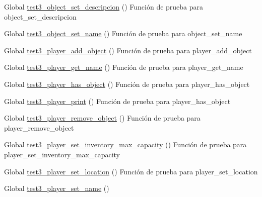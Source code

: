 \begin{DoxyRefList}
\item[Global \mbox{\hyperlink{object__test_8c_a84be9532a8a9cf53a00df0586d065b9f}{test3\+\_\+object\+\_\+set\+\_\+descripcion}} ()]\label{test__test000118}%
%
Función de prueba para object\+\_\+set\+\_\+descripcion  
\item[Global \mbox{\hyperlink{object__test_8c_ab40669b5d083b6484197d917fb6882b1}{test3\+\_\+object\+\_\+set\+\_\+name}} ()]\label{test__test000109}%
%
Función de prueba para object\+\_\+set\+\_\+name  
\item[Global \mbox{\hyperlink{player__test_8c_ac984e5292c95002644a7af4fa499d0fb}{test3\+\_\+player\+\_\+add\+\_\+object}} ()]\label{test__test000140}%
%
Función de prueba para player\+\_\+add\+\_\+object  
\item[Global \mbox{\hyperlink{player__test_8c_a47ca2429d85f332295322002954e1c89}{test3\+\_\+player\+\_\+get\+\_\+name}} ()]\label{test__test000133}%
%
Función de prueba para player\+\_\+get\+\_\+name  
\item[Global \mbox{\hyperlink{player__test_8c_a956409720fca92e245d798491200f3d6}{test3\+\_\+player\+\_\+has\+\_\+object}} ()]\label{test__test000151}%
%
Función de prueba para player\+\_\+has\+\_\+object  
\item[Global \mbox{\hyperlink{player__test_8c_a1d9fc6701483b45427b34a1d8e86e260}{test3\+\_\+player\+\_\+print}} ()]\label{test__test000159}%
%
Función de prueba para player\+\_\+has\+\_\+object  
\item[Global \mbox{\hyperlink{player__test_8c_af84155cb375301e75475a91ef522e191}{test3\+\_\+player\+\_\+remove\+\_\+object}} ()]\label{test__test000143}%
%
Función de prueba para player\+\_\+remove\+\_\+object  
\item[Global \mbox{\hyperlink{player__test_8c_ae3447f70a2f6ccb4f501f7630c667a73}{test3\+\_\+player\+\_\+set\+\_\+inventory\+\_\+max\+\_\+capacity}} ()]\label{test__test000156}%
%
Función de prueba para player\+\_\+set\+\_\+inventory\+\_\+max\+\_\+capacity  
\item[Global \mbox{\hyperlink{player__test_8c_a317c0c84ef6ef843c15d5bab4a6b8a38}{test3\+\_\+player\+\_\+set\+\_\+location}} ()]\label{test__test000146}%
%
Función de prueba para player\+\_\+set\+\_\+location  
\item[Global \mbox{\hyperlink{player__test_8c_a447ebbb4ba2206abeaf4b60200e312da}{test3\+\_\+player\+\_\+set\+\_\+name}} ()]\label{test__test000130}%

\end{DoxyRefList}
